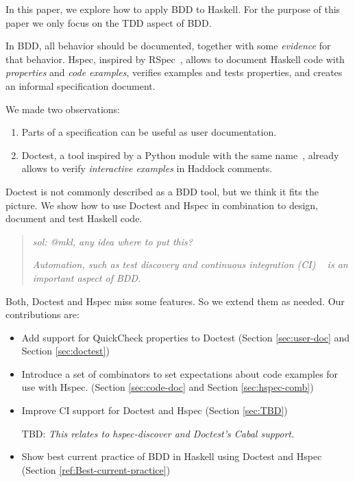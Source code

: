 \documentclass[preprint]{sigplanconf}
\begin{document}
In this paper, we explore how to apply BDD to Haskell.
For the purpose of this paper we only focus on the TDD aspect of BDD.

In BDD, all behavior should be documented, together with some
\emph{evidence} for that behavior.  Hspec, inspired by
RSpec~\cite{rspec}, allows to document Haskell code with
\emph{properties} and \emph{code examples}, verifies examples and
tests properties, and creates an informal specification document.

We made two observations:
\begin{enumerate}
    \item
        Parts of a specification can be useful as user documentation.
    \item
        Doctest, a tool inspired by a Python module with the same
        name~\cite{doctest}, already allows to verify
        \emph{interactive examples} in Haddock comments.
\end{enumerate}

\noindent Doctest is not commonly described as a BDD tool, but we
think it fits the picture.
We show how to use Doctest and Hspec in combination to design,
document and test Haskell code.


\begin{quote}
    \emph{sol: @mkl, any idea where to put this?}

\emph{Automation, such as test discovery and continuous integration (CI)
~\cite{ci} is an important aspect of BDD.}
\end{quote}

Both, Doctest and Hspec miss some features.  So we extend them as
needed.  Our contributions are:

\begin{itemize}
\item
    Add support for QuickCheck properties to Doctest (Section
    \ref{sec:user-doc} and Section \ref{sec:doctest})

\item
    Introduce a set of combinators to set expectations about
    code examples for use with Hspec. (Section \ref{sec:code-doc} and Section \ref{sec:hspec-comb})

\item
    Improve CI support for Doctest and Hspec (Section \ref{sec:TBD})

    TBD:
    \emph{This relates to hspec-discover and Doctest's Cabal support.}

\item
    Show best current practice of BDD in Haskell using Doctest and
    Hspec (Section \ref{ref:Best-current-practice})

\end{itemize}
\end{document}
